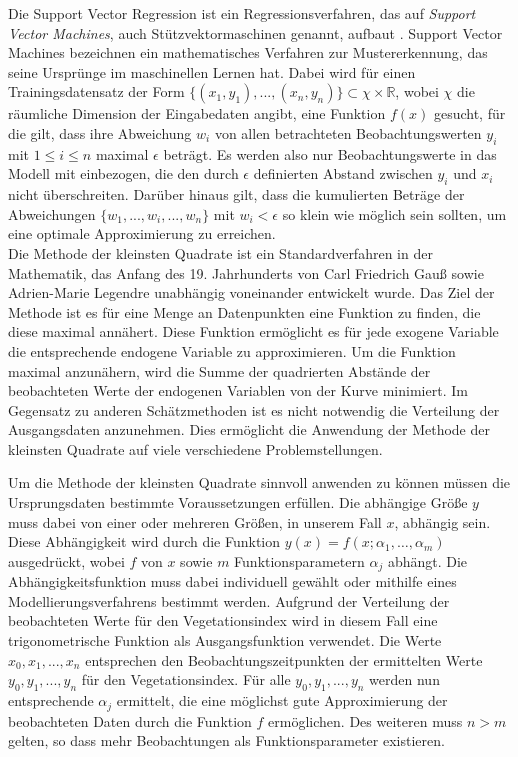 Die Support Vector Regression ist ein Regressionsverfahren, das auf \textit{Support Vector Machines}, auch Stützvektormaschinen genannt, aufbaut \cite{Drucker97}. Support Vector Machines bezeichnen ein mathematisches Verfahren zur Mustererkennung, das seine Ursprünge im maschinellen Lernen hat. Dabei wird für einen Trainingsdatensatz der Form \(\{{(x_1, y_1)},...,{(x_n, y_n)}\} \subset \chi \times \mathbb{R}\), wobei \(\chi\) die räumliche Dimension der Eingabedaten angibt, eine Funktion \(f(x)\) gesucht, für die gilt, dass ihre Abweichung \(w_i\) von allen betrachteten Beobachtungswerten \(y_i\) mit \(1 \leq i \leq n\) maximal \(\epsilon\) beträgt. Es werden also nur Beobachtungswerte in das Modell mit einbezogen, die den durch \(\epsilon\) definierten Abstand zwischen \(y_i\) und \(x_i\) nicht überschreiten. Darüber hinaus gilt, dass die kumulierten Beträge der Abweichungen \(\{w_1,...,w_i,...,w_n\}\) mit \(w_i < \epsilon\) so klein wie möglich sein sollten, um eine optimale Approximierung zu erreichen. \\

Die Methode der kleinsten Quadrate ist ein Standardverfahren in der Mathematik, das Anfang des 19. Jahrhunderts von Carl Friedrich Gauß sowie Adrien-Marie Legendre unabhängig voneinander entwickelt wurde. Das Ziel der Methode ist es für eine Menge an Datenpunkten eine Funktion zu finden, die diese maximal annähert. Diese Funktion ermöglicht es für jede exogene Variable die entsprechende endogene Variable zu approximieren. Um die Funktion maximal anzunähern, wird die Summe der quadrierten Abstände der beobachteten Werte der endogenen Variablen von der Kurve minimiert. Im Gegensatz zu anderen Schätzmethoden ist es nicht notwendig die Verteilung der Ausgangsdaten anzunehmen. Dies ermöglicht die Anwendung der Methode der kleinsten Quadrate auf viele verschiedene Problemstellungen. 

Um die Methode der kleinsten Quadrate sinnvoll anwenden zu können müssen die Ursprungsdaten bestimmte Voraussetzungen erfüllen. Die abhängige Größe \(y\) muss dabei von einer oder mehreren Größen, in unserem Fall \(x\), abhängig sein. Diese Abhängigkeit wird durch die Funktion \(y(x) = f(x;\alpha_1,\dots,\alpha_m)\) ausgedrückt, wobei \(f\) von \(x\) sowie \(m\) Funktionsparametern \(\alpha_j\) abhängt. Die Abhängigkeitsfunktion muss dabei individuell gewählt oder mithilfe eines Modellierungsverfahrens bestimmt werden. Aufgrund der Verteilung der beobachteten Werte für den Vegetationsindex wird in diesem Fall eine trigonometrische Funktion als Ausgangsfunktion verwendet. Die Werte \(x_0, x_1,...,x_n\) entsprechen den Beobachtungszeitpunkten der ermittelten Werte \(y_0, y_1,...,y_n\) für den Vegetationsindex. Für alle \(y_0, y_1,...,y_n\) werden nun entsprechende \(\alpha_j\) ermittelt, die eine möglichst gute Approximierung der beobachteten Daten durch die Funktion \(f\) ermöglichen. Des weiteren muss \(n > m\) gelten, so dass mehr Beobachtungen als Funktionsparameter existieren. 

